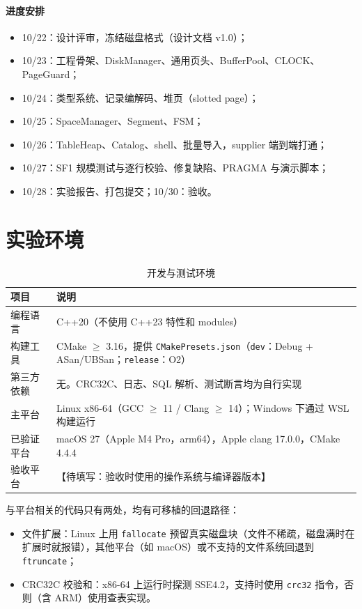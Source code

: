 \documentclass[11pt,a4paper]{ctexart}
\newcommand{\TODO}[1]{\textcolor{todo}{【待填写：#1】}}
\newcommand{\code}[1]{\texttt{#1}}
\begin{document}
\paragraph{进度安排}
\begin{itemize}
  \item 10/22：设计评审，冻结磁盘格式（设计文档 v1.0）；
  \item 10/23：工程骨架、DiskManager、通用页头、BufferPool、CLOCK、PageGuard；
  \item 10/24：类型系统、记录编解码、堆页（slotted page）；
  \item 10/25：SpaceManager、Segment、FSM；
  \item 10/26：TableHeap、Catalog、shell、批量导入，supplier 端到端打通；
  \item 10/27：SF1 规模测试与逐行校验、修复缺陷、PRAGMA 与演示脚本；
  \item 10/28：实验报告、打包提交；10/30：验收。
\end{itemize}

\section{实验环境}

\begin{table}[H]
  \centering
  \caption{开发与测试环境}
  \begin{tabularx}{\textwidth}{l X}
    \toprule
    项目 & 说明 \\
    \midrule
    编程语言 & C++20（不使用 C++23 特性和 modules） \\
    构建工具 & CMake $\geq$ 3.16，提供 \code{CMakePresets.json}（\code{dev}：Debug + ASan/UBSan；\code{release}：O2） \\
    第三方依赖 & 无。CRC32C、日志、SQL 解析、测试断言均为自行实现 \\
    主平台 & Linux x86-64（GCC $\geq$ 11 / Clang $\geq$ 14）；Windows 下通过 WSL 构建运行 \\
    已验证平台 & macOS 27（Apple M4 Pro，arm64），Apple clang 17.0.0，CMake 4.4.4 \\
    验收平台 & \TODO{验收时使用的操作系统与编译器版本} \\
    \bottomrule
  \end{tabularx}
\end{table}

与平台相关的代码只有两处，均有可移植的回退路径：
\begin{itemize}
  \item 文件扩展：Linux 上用 \code{fallocate} 预留真实磁盘块（文件不稀疏，磁盘满时在扩展时就报错），其他平台（如 macOS）或不支持的文件系统回退到 \code{ftruncate}；
  \item CRC32C 校验和：x86-64 上运行时探测 SSE4.2，支持时使用 \code{crc32} 指令，否则（含 ARM）使用查表实现。
\end{itemize}
\end{document}
